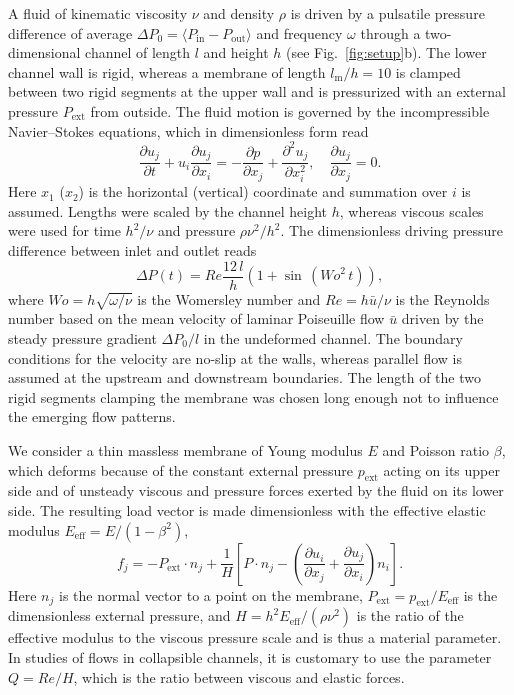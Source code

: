 \documentclass[aps,prl,reprint,superscriptaddress,floatfix]{revtex4-1}
\newcommand{\Rey}{\mathit{Re}}
\newcommand{\Wo}{\mathit{Wo}}
\begin{document}
A fluid of kinematic viscosity $\nu$ and density $\rho$ is driven by a pulsatile pressure difference of average $\Delta P_0=\langle P_\text{in}-P_\text{out}\rangle$ and frequency $\omega$ through a two-dimensional channel of length $l$ and height $h$ (see Fig.~\ref{fig:setup}b). The lower channel wall is rigid, whereas a membrane of length $l_\text{m}/h=10$ is clamped between two rigid segments at the upper wall and is pressurized with an external pressure $P_\text{ext}$ from outside. The fluid motion is governed by the incompressible Navier--Stokes equations, which in dimensionless form read
\begin{equation}
\dfrac{\partial u_j}{\partial t} + u_i\frac{\partial u_j }{\partial x_i} = -\frac{\partial p}{\partial x_j} +  \frac{\partial^2 u_j}{\partial x_i^2} ,\quad  \dfrac{\partial u_j}{\partial x_j} = 0.
\label{eq:NSeqn}
\end{equation}
Here $x_1$ ($x_2$) is the horizontal (vertical) coordinate and summation over $i$ is assumed. Lengths were scaled by the channel height $h$, whereas viscous scales were used for time $h^2/\nu$ and pressure $\rho\nu^2/h^2$. The dimensionless driving pressure difference between inlet and outlet reads 
\begin{equation}
\Delta P(t)=\Rey\dfrac{12\,l}{h}\left(1 + \sin\,(\Wo^2 \, t)\right),
\end{equation}
where $\Wo = h\sqrt{\omega/\nu}$ is the Womersley number and $\Rey=h \bar{u}/\nu$ is the Reynolds number based on the mean velocity of laminar Poiseuille flow $\bar{u}$ driven by the steady pressure gradient $\Delta P_0/l$ in the undeformed channel. The boundary conditions for the velocity are no-slip at the walls, whereas parallel flow is assumed at the upstream and downstream boundaries. The length of the two rigid segments clamping the membrane was chosen long enough not to influence the emerging flow patterns. 

We consider a thin massless membrane of Young modulus $E$ and Poisson ratio $\beta$, which deforms because of the constant external pressure $p_\text{ext}$ acting on its upper side and of unsteady viscous and pressure forces exerted by the fluid on its lower side. The resulting load vector is made dimensionless with the effective elastic modulus $E_\text{eff} = E/(1-\beta^2)$,
\begin{equation}
\label{eq:nondimloadvector}
f_j=-P_\text{ext}\cdot n_j + \frac{1}{H}\left[ P\cdot n_j - \left(\frac{\partial u_i}{\partial x_j} + \frac{\partial u_j}{\partial x_i}\right) n_i\right].
\end{equation}
Here ${n_j}$ is the normal vector to a point on the membrane, $P_\text{ext}=p_\text{ext}/E_\text{eff}$ is the dimensionless external pressure, and $H=h^2 E_\text{eff}/(\rho\nu^2)$ is the ratio of the effective modulus to the viscous pressure scale and is thus a material parameter. In studies of flows in collapsible channels, it is customary to use the parameter $Q=Re/H$, which is the ratio between viscous and elastic forces. 
\end{document}
